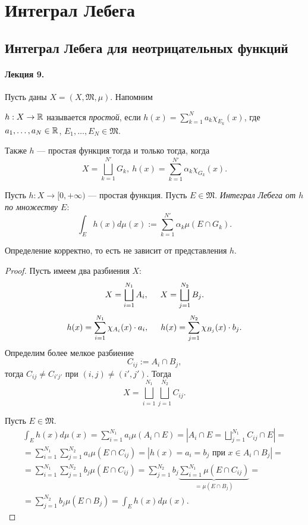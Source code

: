 \section{Интеграл Лебега}
\subsection{Интеграл Лебега для неотрицательных функций}
\paragraph{Лекция 9.}

Пусть даны $X = (X, \mathfrak{M}, \mu)$.
Напомним
\begin{definition}
    $h: X \to \mathbb{R}$ называется \textit{простой}, если $h(x) = \sum\limits_{k=1}^{N} a_k \chi_{E_k}(x)$, где $a_1, \dots, a_N \in \mathbb{R}$,
    $E_1, \dots, E_N \in \mathfrak{M}$.
    
    Также $h$ — простая функция тогда и только тогда, когда
    \[X = \bigsqcup\limits_{k=1}^{N'} G_k, \ h(x) = \sum\limits_{k=1}^{N'}\alpha_k \chi_{G_k}(x).\]
\end{definition} 
\begin{definition}
    Пусть $h: X \to [0, +\infty)$ — простая функция.
    Пусть $E \in \mathfrak{M}$.
    \textit{Интеграл Лебега от $h$ по множеству $E$}:
    \[\int_E h(x) d\mu(x) := \sum\limits_{k=1}^{N'}\alpha_k \mu(E \cap G_k).\]
\end{definition} 

\begin{lemma}
    Определение корректно, то есть не зависит от представления $h$.
\end{lemma} 
\begin{proof}
    Пусть имеем два разбиения $X$:
    \[X = \bigsqcup\limits_{i=1}^{N_1} A_i, \hspace*{.5cm} X = \bigsqcup\limits_{j=1}^{N_2}B_j.\]
    \[h(x) = \sum\limits_{i=1}^{N_1}\chi_{A_i} (x) \cdot a_i,
    \hspace*{.5cm}
    h(x) = \sum\limits_{j=1}^{N_2} \chi_{B_j}(x) \cdot b_j.\]
    Определим более мелкое разбиение
    \[C_{ij} := A_i \cap B_j,\]
    тогда $C_{ij} \neq C_{i'j'}$ при $(i,j) \neq (i', j')$.
    Тогда
    \[X = \bigsqcup\limits_{i=1}^{N_1}\bigsqcup\limits_{j=1}^{N_2}C_{ij}.\]

    Пусть $E \in \mathfrak{M}$.
    \begin{multline*}
        \int_E h(x) d\mu(x) 
        = \sum\limits_{i=1}^{N_1}a_i \mu(A_i \cap E) 
        = \left| A_i \cap E 
        = \bigsqcup\limits_{j=1}^{N_1} C_{ij} \cap E \right| 
        =\\= 
        \sum\limits_{i=1}^{N_1} \sum\limits_{j=1}^{N_2} a_i \mu(E \cap C_{ij})
        = \left| h(x) = a_i = b_j \text{ при } x \in A_i \cap B_j \right| 
        =\\=
        \sum\limits_{i=1}^{N_1} \sum\limits_{j=1}^{N_2} b_j \mu(E \cap C_{ij}) 
        = \sum\limits_{j=1}^{N_2}b_j \underbrace{\sum\limits_{i=1}^{N_1} \mu(E \cap C_{ij})}_{=\mu(E \cap B_j)} 
        =\\=
        \sum\limits_{j=1}^{N_2} b_j \mu(E \cap B_j) = \int_E h(x) d\mu(x).
    \end{multline*} 
\end{proof} 

